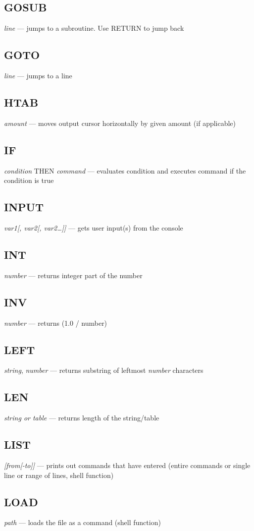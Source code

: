 \subsection{GOSUB} \emph{line} --- jumps to a subroutine. Use RETURN to jump back
\subsection{GOTO} \emph{line} --- jumps to a line
\subsection{HTAB} \emph{amount} --- moves output cursor horizontally by given amount (if applicable)
\subsection{IF} \emph{condition} THEN \emph{command} --- evaluates condition and executes command if the condition is true
\subsection{INPUT} \emph{var1[, var2[, var2\ldots]]} --- gets user input(s) from the console
\subsection{INT} \emph{number} --- returns integer part of the number
\subsection{INV} \emph{number} --- returns (1.0 / number)
\subsection{LEFT} \emph{string}, \emph{number} --- returns substring of leftmost \emph{number} characters
\subsection{LEN} \emph{string or table} --- returns length of the string/table
\subsection{LIST} \emph{[from[-to]]} --- prints out commands that have entered (entire commands or single line or range of lines, shell function)
\subsection{LOAD} \emph{path} --- loads the file as a command (shell function)
